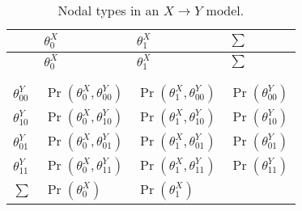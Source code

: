 \documentclass[
  11pt,
  article]{jss}
\begin{document}
\begin{longtable}[]{@{}
  >{\centering\arraybackslash}p{}
  >{\centering\arraybackslash}p{}
  >{\centering\arraybackslash}p{}
  >{\centering\arraybackslash}p{}@{}}
\toprule\noalign{}
\begin{minipage}[b]{\linewidth}\centering
\end{minipage} & \begin{minipage}[b]{\linewidth}\centering
\(\theta^X_{0}\)
\end{minipage} & \begin{minipage}[b]{\linewidth}\centering
\(\theta^X_{1}\)
\end{minipage} & \begin{minipage}[b]{\linewidth}\centering
\(\sum\)
\end{minipage} \\
\midrule\noalign{}
\endfirsthead
\toprule\noalign{}
\begin{minipage}[b]{\linewidth}\centering
\end{minipage} & \begin{minipage}[b]{\linewidth}\centering
\(\theta^X_{0}\)
\end{minipage} & \begin{minipage}[b]{\linewidth}\centering
\(\theta^X_{1}\)
\end{minipage} & \begin{minipage}[b]{\linewidth}\centering
\(\sum\)
\end{minipage} \\
\midrule\noalign{}
\endhead
\bottomrule\noalign{}
\tabularnewline
\caption{Nodal types in an \(X \rightarrow Y\)
model.}\label{tbl-joint}\tabularnewline
\endlastfoot
\(\theta^Y_{00}\) & \(\Pr(\theta^X_0, \theta^Y_{00})\) &
\(\Pr(\theta^X_1, \theta^Y_{00})\) & \(\Pr(\theta^Y_{00})\) \\
\(\theta^Y_{10}\) & \(\Pr(\theta^X_0, \theta^Y_{10})\) &
\(\Pr(\theta^X_1, \theta^Y_{10})\) & \(\Pr(\theta^Y_{10})\) \\
\(\theta^Y_{01}\) & \(\Pr(\theta^X_0, \theta^Y_{01})\) &
\(\Pr(\theta^X_1, \theta^Y_{01})\) & \(\Pr(\theta^Y_{01})\) \\
\(\theta^Y_{11}\) & \(\Pr(\theta^X_0, \theta^Y_{11})\) &
\(\Pr(\theta^X_1, \theta^Y_{11})\) & \(\Pr(\theta^Y_{11})\) \\
\(\sum\) & \(\Pr(\theta^X_0)\) & \(\Pr(\theta^X_1)\) & 1 \\
\end{longtable}
\end{document}
